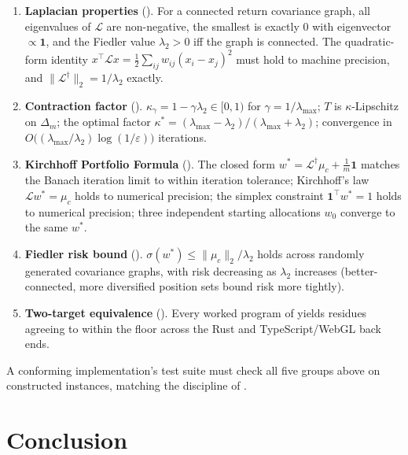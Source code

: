 \documentclass[11pt,a4paper]{article}
\theoremstyle{thmstyle}
\theoremstyle{definition}
\theoremstyle{remark}
\newcommand{\wt}{w}
\newcommand{\norm}[1]{\lVert#1\rVert}
\newcommand{\Lap}{\mathcal{L}}
\newcommand{\simplex}{\Delta_m}
\newcommand{\eps}{\varepsilon}
\begin{document}
\begin{enumerate}[leftmargin=1.6em,itemsep=3pt]
\item \textbf{Laplacian properties} (). For a
connected return covariance graph, all eigenvalues of $\Lap$ are
non-negative, the smallest is exactly $0$ with eigenvector
$\propto\mathbf{1}$, and the Fiedler value $\lambda_2>0$ iff the graph
is connected. The quadratic-form identity
$x^\top\Lap x=\tfrac12\sum_{ij}\wt_{ij}(x_i-x_j)^2$ must hold to machine
precision, and $\norm{\Lap^{\dagger}}_2=1/\lambda_2$ exactly.
\item \textbf{Contraction factor} ().
$\kappa_\gamma=1-\gamma\lambda_2\in[0,1)$ for $\gamma=1/\lambda_{\max}$;
$T$ is $\kappa$-Lipschitz on $\simplex$; the optimal factor
$\kappa^\ast=(\lambda_{\max}-\lambda_2)/(\lambda_{\max}+\lambda_2)$;
convergence in $O\bigl((\lambda_{\max}/\lambda_2)\log(1/\eps)\bigr)$
iterations.
\item \textbf{Kirchhoff Portfolio Formula} (). The
closed form $w^\ast=\Lap^{\dagger}\mu_c+\tfrac1m\mathbf{1}$ matches the
Banach iteration limit to within iteration tolerance; Kirchhoff's law
$\Lap w^\ast=\mu_c$ holds to numerical precision; the simplex
constraint $\mathbf{1}^\top w^\ast=1$ holds to numerical precision;
three independent starting allocations $w_0$ converge to the same
$w^\ast$.
\item \textbf{Fiedler risk bound} ().
$\sigma(w^\ast)\le\norm{\mu_c}_2/\lambda_2$ holds across randomly
generated covariance graphs, with risk decreasing as $\lambda_2$
increases (better-connected, more diversified position sets bound risk
more tightly).
\item \textbf{Two-target equivalence} (). Every
worked program of  yields residues agreeing to
within the floor across the Rust and TypeScript/WebGL back ends.
\end{enumerate}

A conforming implementation's test suite must check all five groups
above on constructed instances, matching the discipline of
.

\section{Conclusion}
\label{sec:conclusion}
\end{document}
